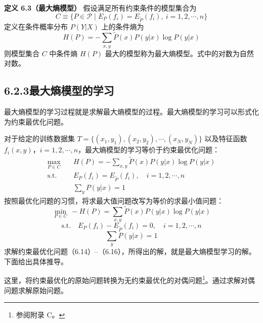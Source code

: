 \documentclass[UTF8, 12pt, fontset=fandol, oneside]{ctexart}
\begin{document}
\noindent\textbf{定义 6.3（最大熵模型）}\quad
假设满足所有约束条件的模型集合为
\begin{equation}
C\equiv\{P\in\mathcal{P}\mid E_P(f_i)=E_{\tilde{P}}(f_i),\ i=1,2,\cdots,n\}
\tag{6.12}
\end{equation}
定义在条件概率分布 $P(Y|X)$ 上的条件熵为
\begin{equation}
H(P)=-\sum_{x,y}\tilde{P}(x)P(y|x)\log P(y|x)
\tag{6.13}
\end{equation}
则模型集合 $C$ 中条件熵 $H(P)$ 最大的模型称为最大熵模型。式中的对数为自然对数。

\subsection*{6.2.3\quad 最大熵模型的学习}

最大熵模型的学习过程就是求解最大熵模型的过程。最大熵模型的学习可以形式化为约束最优化问题。

对于给定的训练数据集 $T=\{(x_1,y_1),(x_2,y_2),\cdots,(x_N,y_N)\}$ 以及特征函数 $f_i(x,y)$，$i=1,2,\cdots,n$，最大熵模型的学习等价于约束最优化问题：
\[
\begin{aligned}
\max_{P\in C}\quad &H(P)=-\sum_{x,y}\tilde{P}(x)P(y|x)\log P(y|x)\\
\mathrm{s.t.}\quad &E_P(f_i)=E_{\tilde{P}}(f_i),\quad i=1,2,\cdots,n\\
&\sum_y P(y|x)=1
\end{aligned}
\]
按照最优化问题的习惯，将求最大值问题改写为等价的求最小值问题：
\begin{equation}
\min_{P\in C}\ -H(P)=\sum_{x,y}\tilde{P}(x)P(y|x)\log P(y|x)
\tag{6.14}
\end{equation}
\begin{equation}
\mathrm{s.t.}\quad E_P(f_i)-E_{\tilde{P}}(f_i)=0,\quad i=1,2,\cdots,n
\tag{6.15}
\end{equation}
\begin{equation}
\sum_y P(y|x)=1
\tag{6.16}
\end{equation}
求解约束最优化问题（6.14）--（6.16），所得出的解，就是最大熵模型学习的解。下面给出具体推导。

这里，将约束最优化的原始问题转换为无约束最优化的对偶问题\footnote{参阅附录 C。}。通过求解对偶问题求解原始问题。
\end{document}

